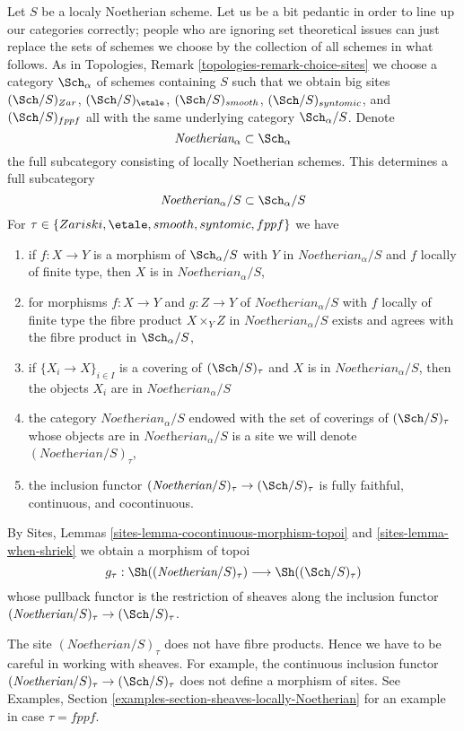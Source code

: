 \medskip\noindent
Let $S$ be a localy Noetherian scheme. Let us be a bit pedantic in order
to line up our categories correctly; people who are ignoring set theoretical
issues can just replace the sets of schemes we choose by the collection
of all schemes in what follows. As in
Topologies, Remark \ref{topologies-remark-choice-sites}
we choose a category $\Sch_\alpha$ of schemes containing
$S$ such that we obtain big sites $(\Sch/S)_{Zar}$,
$(\Sch/S)_\etale$, $(\Sch/S)_{smooth}$, $(\Sch/S)_{syntomic}$,
and $(\Sch/S)_{fppf}$ all with the same underlying
category $\Sch_\alpha/S$. Denote
$$
\textit{Noetherian}_\alpha \subset \Sch_\alpha
$$
the full subcategory consisting of locally Noetherian schemes.
This determines a full subcategory
$$
\textit{Noetherian}_\alpha/S \subset \Sch_\alpha/S
$$
For $\tau \in \{Zariski, \etale, smooth, syntomic, fppf\}$ we have
\begin{enumerate}
\item if $f : X \to Y$ is a morphism of $\Sch_\alpha/S$
with $Y$ in $\textit{Noetherian}_\alpha/S$ and
$f$ locally of finite type, then $X$ is in $\textit{Noetherian}_\alpha/S$,
\item for morphisms $f : X \to Y$ and $g : Z \to Y$ of
$\textit{Noetherian}_\alpha/S$ with $f$ locally of finite type
the fibre product $X \times_Y Z$ in $\textit{Noetherian}_\alpha/S$
exists and agrees with the fibre product in $\Sch_\alpha/S$,
\item if $\{X_i \to X\}_{i \in I}$ is a covering of
$(\Sch/S)_\tau$ and $X$ is in $\textit{Noetherian}_\alpha/S$,
then the objects $X_i$ are in $\textit{Noetherian}_\alpha/S$
\item the category $\textit{Noetherian}_\alpha/S$ endowed
with the set of coverings of $(\Sch/S)_\tau$ whose objects
are in $\textit{Noetherian}_\alpha/S$ is a site
we will denote $(\textit{Noetherian}/S)_\tau$,
\item the inclusion functor
$(\textit{Noetherian}/S)_\tau \to (\Sch/S)_\tau$
is fully faithful, continuous, and cocontinuous.
\end{enumerate}
By Sites, Lemmas \ref{sites-lemma-cocontinuous-morphism-topoi} and
\ref{sites-lemma-when-shriek} we obtain a morphism of topoi
$$
g_\tau : \Sh((\textit{Noetherian}/S)_\tau) \longrightarrow \Sh((\Sch/S)_\tau)
$$
whose pullback functor is the restriction of sheaves along
the inclusion functor $(\textit{Noetherian}/S)_\tau \to (\Sch/S)_\tau$.

\begin{remark}[Warning]
\label{remark-no-fibre-products}
The site $(\textit{Noetherian}/S)_\tau$ does not have fibre products.
Hence we have to be careful in working with sheaves. For example,
the continuous inclusion functor
$(\textit{Noetherian}/S)_\tau \to (\Sch/S)_\tau$
does not define a morphism of sites. See
Examples, Section \ref{examples-section-sheaves-locally-Noetherian}
for an example in case $\tau = fppf$.
\end{remark}


